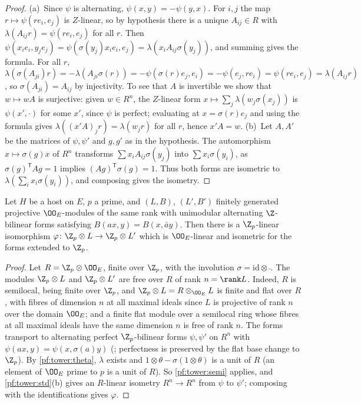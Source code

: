 \begin{proof}
(a)~Since $\psi$ is alternating, $\psi(x,y)=-\psi(y,x)$. For $i,j$ the map $r\mapsto\psi(re_i,e_j)$ is $Z$-linear, so by
hypothesis there is a unique $A_{ij}\in R$ with $\lambda(A_{ij}r)=\psi(re_i,e_j)$ for all $r$. Then
$\psi(x_ie_i,y_je_j)=\psi(\sigma(y_j)x_ie_i,e_j)=\lambda(x_iA_{ij}\sigma(y_j))$, and summing gives the formula. For all $r$,
$\lambda(\sigma(A_{ji})r)=-\lambda(A_{ji}\sigma(r))=-\psi(\sigma(r)e_j,e_i)=-\psi(e_j,re_i)=\psi(re_i,e_j)=\lambda(A_{ij}r)$, so
$\sigma(A_{ji})=A_{ij}$ by injectivity. To see that $A$ is invertible we show that $w\mapsto wA$ is surjective: given $w\in R^n$,
the $Z$-linear form $x\mapsto\sum_j\lambda(w_j\sigma(x_j))$ is $\psi(x',\cdot)$ for some $x'$, since $\psi$ is perfect; evaluating
at $x=\sigma(r)e_j$ and using the formula gives $\lambda((x'A)_jr)=\lambda(w_jr)$ for all $r$, hence $x'A=w$.
(b)~Let $A,A'$ be the matrices of $\psi,\psi'$ and $g,g'$ as in the hypothesis. The automorphism $x\mapsto\sigma(g)x$ of $R^n$
transforms $\sum x_iA_{ij}\sigma(y_j)$ into $\sum x_i\sigma(y_i)$, as $\sigma(g)^{\mathsf T}Ag=1$ implies
$(Ag)^{\mathsf T}\sigma(g)=1$. Thus both forms are isometric to $\lambda(\sum_ix_i\sigma(y_i))$, and composing gives the isometry.
\end{proof}

\begin{proposition}\label{pf:tower:padic}
Let $H$ be a host on $E$, $p$ a prime, and $(L,B)$, $(L',B')$ finitely generated projective $\OO_E$-modules of the same rank with
unimodular alternating $\Z$-bilinear forms satisfying $B(ax,y)=B(x,\bar ay)$. Then there is a $\Z_p$-linear isomorphism
$\varphi\colon\Z_p\otimes L\to\Z_p\otimes L'$ which is $\OO_E$-linear and isometric for the forms extended to $\Z_p$.
\end{proposition}

\begin{proof}
Let $R=\Z_p\otimes\OO_E$, finite over $\Z_p$, with the involution $\sigma=\mathrm{id}\otimes\bar{\ }$. The modules
$\Z_p\otimes L$ and $\Z_p\otimes L'$ are free over $R$ of rank $n=\rank L$. Indeed, $R$ is semilocal, being finite over
$\Z_p$, and $\Z_p\otimes L=R\otimes_{\OO_E}L$ is finite and flat over $R$, with fibres of dimension $n$ at all maximal ideals
since $L$ is projective of rank $n$ over the domain $\OO_E$; and a finite flat module over a semilocal ring whose fibres at all
maximal ideals have the same dimension $n$ is free of rank $n$. The forms transport to alternating perfect $\Z_p$-bilinear
forms $\psi,\psi'$ on $R^n$ with
$\psi(ax,y)=\psi(x,\sigma(a)y)$ (; perfectness is preserved by the
flat base change to $\Z_p$). By \cref{pf:tower:theta}, $\lambda$ exists and $1\otimes\theta-\sigma(1\otimes\theta)$ is a unit
of $R$ (an element of $\OO_E$ prime to $p$ is a unit of $R$). So \cref{pf:tower:semi} applies, and \cref{pf:tower:std}(b)
gives an $R$-linear isometry $R^n\to R^n$ from $\psi$ to $\psi'$; composing with the identifications gives $\varphi$.
\end{proof}

